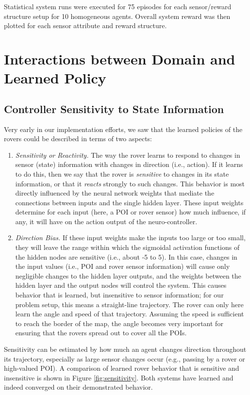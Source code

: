 \documentclass[letterpaper, 10 pt, conference]{ieeeconf}  %
\begin{document}
Statistical system runs were executed for 75 episodes for each
sensor/reward structure setup for 10 homogeneous agents.  Overall system reward was then plotted for each
sensor attribute and reward structure.


\section{Interactions between Domain and Learned Policy}
\subsection{Controller Sensitivity to State Information}
Very early in our implementation efforts, we saw that the learned policies of the rovers could be described in terms of two aspects:

\begin{enumerate}
\item \emph{Sensitivity or Reactivity.} The way the rover learns to respond to changes in sensor (state) information with changes in direction (i.e., action). If it learns to do this, then we say that the rover is \emph{sensitive} to changes in its state information, or that it \emph{reacts} strongly to such changes. This behavior is most directly influenced by the neural network weights that mediate the connections between inputs and the single hidden layer. These input weights determine for each input (here, a POI or rover sensor) how much influence, if any, it will have on the action output of the neuro-controller. 

\item \emph{Direction Bias.} If these input weights make the inputs too large or too small, they will leave the range within which the sigmoidal activation functions of the hidden nodes are sensitive (i.e., about -5 to 5). In this case, changes in the input values (i.e., POI and rover sensor information) will cause only negligible changes to the hidden layer outputs, and the weights between the hidden layer and the output nodes will control the system. This causes behavior that is learned, but insensitive to sensor information; for our problem setup, this means a straight-line trajectory. The rover can only here learn the angle and speed of that trajectory. Assuming the speed is sufficient to reach the border of the map, the angle becomes very important for ensuring that the rovers spread out to cover all the POIs. 
\end{enumerate}

Sensitivity can be estimated by how much an agent changes direction throughout its trajectory, especially as large sensor changes occur (e.g., passing by a rover or high-valued POI). A comparison of learned rover behavior that is sensitive and insensitive is shown in Figure \ref{fig:sensitivity}. Both systems have learned and indeed converged on their demonstrated behavior. 
\end{document}
